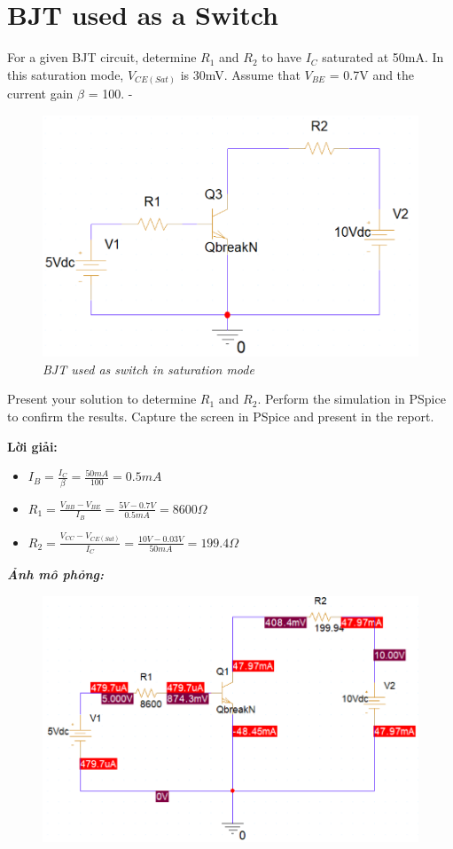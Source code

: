 \section{BJT used as a Switch}
For a given BJT circuit, determine $R_1$ and $R_2$ to have $I_C$ saturated at 50mA. In this saturation mode, $V_{CE(Sat)}$ is 30mV. Assume that $V_{BE}$ = 0.7V and the current gain $\beta$ = 100.
-
\begin{figure}[!htp]
    \centering
    \includegraphics[width=1\linewidth]{graphics/ex3/f1.PNG}
    \caption{\textit{BJT used as switch in saturation mode}}
\end{figure}

Present your solution to determine $R_1$ and $R_2$.
Perform the simulation in PSpice to confirm the results. Capture the screen in PSpice and present in the report.

\textbf{Lời giải:}
\begin{itemize}
    \item $I_B = \frac{I_C}{\beta} = \frac{50mA}{100} = 0.5 mA$

    \item $R_1 = \frac{V_{BB} - V_{BE}}{I_B} = \frac{5V - 0.7V}{0.5 mA} = 8600 \Omega $

    \item $R_2 = \frac{V_{CC} - V_{CE(Sat)}}{I_C} = \frac{10V - 0.03V}{50 mA} = 199.4 \Omega $
\end{itemize}

\newpage
\textbf{\textit{Ảnh mô phỏng:}}\\
\begin{figure}[!htbp]
    \centering
    
    \includegraphics[width=1\linewidth]{graphics/ex3/f2.png}
\end{figure}
